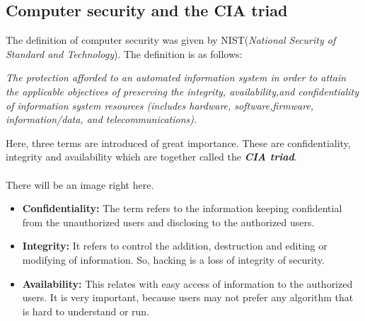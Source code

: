 \documentclass[a4paper,12pt]{article}
\newcommand{\R}{\color{red}}
\begin{document}
	\subsection{Computer security and the CIA triad}
	The definition of computer security was given by NIST({\it National Security of Standard and Technology}). The definition is as follows:
	\begin{center}
		\it The protection afforded to an automated information system
		in order to attain the applicable objectives of preserving the integrity, availability,and confidentiality of information system resources (includes hardware, software,firmware, information/data, and telecommunications).
	\end{center}
\noindent Here, three terms are introduced of great importance. These are confidentiality, integrity and availability which are together called the { \bf {\it CIA triad}}.
 {\R \\\\There will be an image right here.} 
\begin{itemize}
	\item {\bf Confidentiality:} The term refers to the information keeping confidential from the unauthorized users and disclosing to the authorized users.
	\item {\bf Integrity:} It refers to control the addition, destruction and editing or modifying of information. So, hacking is a loss of integrity of security.
	\item {\bf Availability:} This relates with easy access of information to the authorized users. It is very important, because users may not prefer any algorithm that is hard to understand or run.
\end{itemize}
\end{document}
